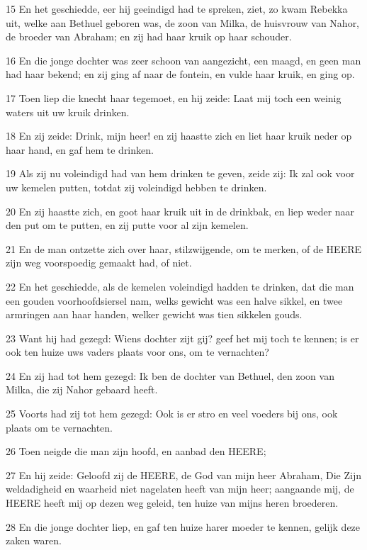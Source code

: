\par 15 En het geschiedde, eer hij geeindigd had te spreken, ziet, zo kwam Rebekka uit, welke aan Bethuel geboren was, de zoon van Milka, de huisvrouw van Nahor, de broeder van Abraham; en zij had haar kruik op haar schouder.
\par 16 En die jonge dochter was zeer schoon van aangezicht, een maagd, en geen man had haar bekend; en zij ging af naar de fontein, en vulde haar kruik, en ging op.
\par 17 Toen liep die knecht haar tegemoet, en hij zeide: Laat mij toch een weinig waters uit uw kruik drinken.
\par 18 En zij zeide: Drink, mijn heer! en zij haastte zich en liet haar kruik neder op haar hand, en gaf hem te drinken.
\par 19 Als zij nu voleindigd had van hem drinken te geven, zeide zij: Ik zal ook voor uw kemelen putten, totdat zij voleindigd hebben te drinken.
\par 20 En zij haastte zich, en goot haar kruik uit in de drinkbak, en liep weder naar den put om te putten, en zij putte voor al zijn kemelen.
\par 21 En de man ontzette zich over haar, stilzwijgende, om te merken, of de HEERE zijn weg voorspoedig gemaakt had, of niet.
\par 22 En het geschiedde, als de kemelen voleindigd hadden te drinken, dat die man een gouden voorhoofdsiersel nam, welks gewicht was een halve sikkel, en twee armringen aan haar handen, welker gewicht was tien sikkelen gouds.
\par 23 Want hij had gezegd: Wiens dochter zijt gij? geef het mij toch te kennen; is er ook ten huize uws vaders plaats voor ons, om te vernachten?
\par 24 En zij had tot hem gezegd: Ik ben de dochter van Bethuel, den zoon van Milka, die zij Nahor gebaard heeft.
\par 25 Voorts had zij tot hem gezegd: Ook is er stro en veel voeders bij ons, ook plaats om te vernachten.
\par 26 Toen neigde die man zijn hoofd, en aanbad den HEERE;
\par 27 En hij zeide: Geloofd zij de HEERE, de God van mijn heer Abraham, Die Zijn weldadigheid en waarheid niet nagelaten heeft van mijn heer; aangaande mij, de HEERE heeft mij op dezen weg geleid, ten huize van mijns heren broederen.
\par 28 En die jonge dochter liep, en gaf ten huize harer moeder te kennen, gelijk deze zaken waren.
